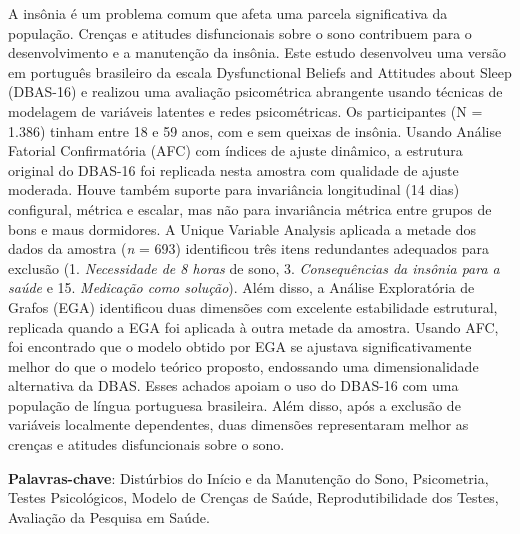 \documentclass[
  12pt,
  twoside,
  openright,
  a4paper,
  chapter=TITLE,
  section=TITLE,
  brazil]{abntex2}
\begin{document}


\setlength{\absparsep}{18pt}
\begin{resumo}[Resumo]
  
  A insônia é um problema comum que afeta uma parcela significativa da população. Crenças e atitudes disfuncionais sobre o sono contribuem para o desenvolvimento e a manutenção da insônia. Este estudo desenvolveu uma versão em português brasileiro da escala Dysfunctional Beliefs and Attitudes about Sleep (DBAS-16) e realizou uma avaliação psicométrica abrangente usando técnicas de modelagem de variáveis latentes e redes psicométricas. Os participantes (N = 1.386) tinham entre 18 e 59 anos, com e sem queixas de insônia. Usando Análise Fatorial Confirmatória (AFC) com índices de ajuste dinâmico, a estrutura original do DBAS-16 foi replicada nesta amostra com qualidade de ajuste moderada. Houve também suporte para invariância longitudinal (14 dias) configural, métrica e escalar, mas não para invariância métrica entre grupos de bons e maus dormidores. A Unique Variable Analysis aplicada a metade dos dados da amostra (\emph{n} = 693) identificou três itens redundantes adequados para exclusão (1. \emph{Necessidade de 8 horas} de sono, 3. \emph{Consequências da insônia para a saúde} e 15. \emph{Medicação como solução}). Além disso, a Análise Exploratória de Grafos (EGA) identificou duas dimensões com excelente estabilidade estrutural, replicada quando a EGA foi aplicada à outra metade da amostra. Usando AFC, foi encontrado que o modelo obtido por EGA se ajustava significativamente melhor do que o modelo teórico proposto, endossando uma dimensionalidade alternativa da DBAS. Esses achados apoiam o uso do DBAS-16 com uma população de língua portuguesa brasileira. Além disso, após a exclusão de variáveis localmente dependentes, duas dimensões representaram melhor as crenças e atitudes disfuncionais sobre o sono.

  \textbf{Palavras-chave}: Distúrbios do Início e da Manutenção do Sono, Psicometria, Testes Psicológicos, Modelo de Crenças de Saúde, Reprodutibilidade dos Testes, Avaliação da Pesquisa em Saúde.
\end{resumo}
\end{document}
